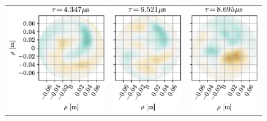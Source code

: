 \begin{figure}[h!]
\begin{tabular}{ccc}
  \includegraphics{fig/results/blobs/matrix-perp-blobs-B0_0.08-fluct/6} &
  \includegraphics{fig/results/blobs/matrix-perp-blobs-B0_0.08-fluct/7} &
  \includegraphics{fig/results/blobs/matrix-perp-blobs-B0_0.08-fluct/8} \\

\end{tabular}
\end{figure}
